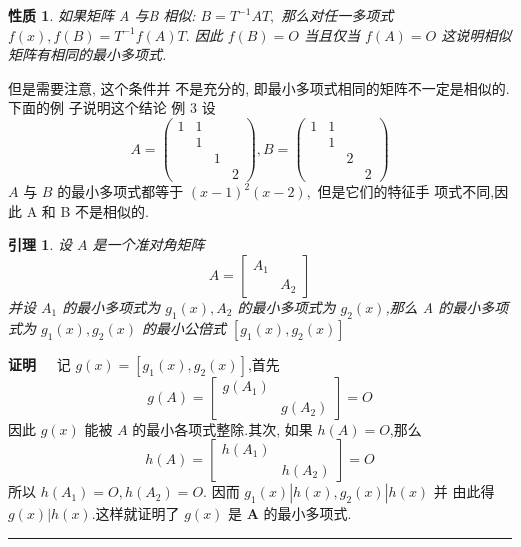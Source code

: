 \documentclass[13pt]{beamer}
\newtheorem{lem}{引理}
\newtheorem*{prop}{性质}
\def\qed{\nopagebreak\hfill{\rule{4pt}{7pt}}\medbreak}
\def\pf{{\bf 证明~~ }}
\begin{document}
\begin{frame}
\begin{prop}
如果矩阵 A 与B 相似: ${B}={T}^{-1} {A T},$ 那么对任一多项式
$f(x), f({B})={T}^{-1} f({A}) {T} .$ 因此 $f({B})={O}$ 当且仅当 $f({A})={O}$
这说明相似矩阵有相同的最小多项式.
\end{prop}
但是需要注意, 这个条件并 不是充分的, 即最小多项式相同的矩阵不一定是相似的.下面的例 子说明这个结论 例 3 设
\[
{A}=\left(\begin{array}{cccc}
1 & 1 && \\
& 1&& \\
&& 1&\\
&&&2
\end{array}\right), 
{B}=\left(\begin{array}{cccc}
1 & 1 &  &\\
& 1  &&\\
& & 2 &\\
& & &2
\end{array}\right)
\]
${A}$ 与 ${B}$ 的最小多项式都等于 $(x-1)^{2}(x-2),$ 但是它们的特征手 项式不同,因此 A 和 B 不是相似的.
\end{frame}

\begin{frame}
\small{
\begin{lem}
设 $A$ 是一个准对角矩阵
\[
{A}=\left[\begin{array}{ll}
{A}_{1} & \\
& {A}_{2}
\end{array}\right]
\]
并设 $A_{1}$ 的最小多项式为 $g_{1}(x), {A}_{2}$ 的最小多项式为 $g_{2}(x)$,那么 A 的最小多项式为 $g_{1}(x), g_{2}(x)$ 的最小公倍式 $\left[g_{1}(x), g_{2}(x)\right]$
\end{lem}
\pf 
记 $g(x)=\left[g_{1}(x), g_{2}(x)\right]$,首先
\[
g({A})=\left[\begin{array}{cc}
g\left({A}_{1}\right) & \\
& g\left({A}_{2}\right)
\end{array}\right]={O}
\]
因此 $g(x)$ 能被 $A$ 的最小各项式整除.其次, 如果 $h({A})={O}$,那么
\[
h({A})=\left[\begin{array}{cc}
h\left({A}_{1}\right) & \\
& h\left({A}_{2}\right)
\end{array}\right]={O}
\]
所以 $h\left({A}_{1}\right)={O}, h\left({A}_{2}\right)={O} .$ 因而 $g_{1}(x)\left|h(x), g_{2}(x)\right| h(x)$ 并
由此得 $g(x) | h(x)$.这样就证明了 $g(x)$ 是 $\mathbf{A}$ 的最小多项式.
\qed}
\end{frame}
\end{document}
